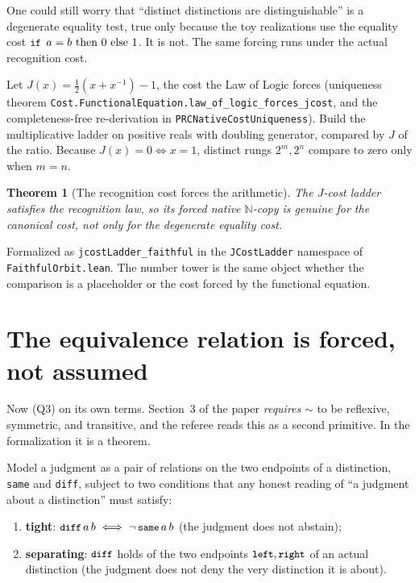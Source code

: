 \documentclass[11pt,a4paper]{article}
\newtheorem{theorem}{Theorem}[section]
\theoremstyle{definition}
\theoremstyle{remark}
\newcommand{\code}[1]{\texttt{\small #1}}
\begin{document}
One could still worry that ``distinct distinctions are distinguishable'' is a
degenerate equality test, true only because the toy realizations use the
equality cost $\code{if } a=b \text{ then } 0 \text{ else } 1$. It is not. The
same forcing runs under the actual recognition cost.

Let $J(x) = \tfrac{1}{2}(x + x^{-1}) - 1$, the cost the Law of Logic forces
(uniqueness theorem \code{Cost.FunctionalEquation.law\_of\_logic\_forces\_jcost},
and the completeness-free re-derivation in \code{PRCNativeCostUniqueness}).
Build the multiplicative ladder on positive reals with doubling generator,
compared by $J$ of the ratio. Because $J(x) = 0 \iff x = 1$, distinct rungs
$2^m, 2^n$ compare to zero only when $m = n$.

\begin{theorem}[The recognition cost forces the arithmetic]\label{thm:jcost}
The $J$-cost ladder satisfies the recognition law, so its forced native
$\mathbb{N}$-copy is genuine for the canonical cost, not only for the degenerate
equality cost.
\end{theorem}

Formalized as \code{jcostLadder\_faithful} in the \code{JCostLadder} namespace of
\code{FaithfulOrbit.lean}. The number tower is the same object whether the
comparison is a placeholder or the cost forced by the functional equation.

\section{The equivalence relation is forced, not assumed}\label{sec:onequiv}

Now (Q3) on its own terms. Section~3 of the paper \emph{requires} $\sim$ to be
reflexive, symmetric, and transitive, and the referee reads this as a second
primitive. In the formalization it is a theorem.

Model a judgment as a pair of relations on the two endpoints of a distinction,
\code{same} and \code{diff}, subject to two conditions that any honest reading of
``a judgment about a distinction'' must satisfy:
\begin{enumerate}[leftmargin=2em, label=\textup{(\roman*)}]
  \item \textbf{tight}: $\code{diff}\,a\,b \iff \lnot\,\code{same}\,a\,b$ (the
    judgment does not abstain);
  \item \textbf{separating}: $\code{diff}$ holds of the two endpoints
    $\code{left}, \code{right}$ of an actual distinction (the judgment does not
    deny the very distinction it is about).
\end{enumerate}
\end{document}

